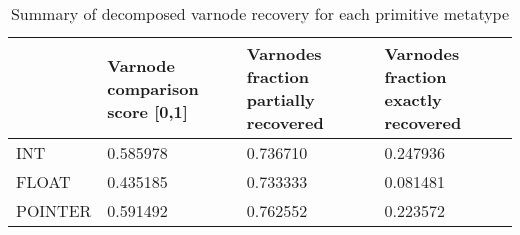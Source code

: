 \begin{table}[t]
\centering
\caption{Summary of decomposed varnode recovery for each primitive metatype}
\label{table:metatype-recovery-summary-decomposed}
\begin{tabular}{lp{6.0cm}p{6.0cm}p{6.0cm}}
\toprule
{} &  Varnode comparison score [0,1] &  Varnodes fraction partially recovered &  Varnodes fraction exactly recovered \\
\midrule
INT     &                        0.585978 &                               0.736710 &                             0.247936 \\
FLOAT   &                        0.435185 &                               0.733333 &                             0.081481 \\
POINTER &                        0.591492 &                               0.762552 &                             0.223572 \\
\bottomrule
\end{tabular}
\end{table}
